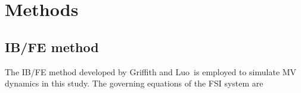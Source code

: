 \documentclass[fleqn,10pt]{wlscirep}
\begin{document}



\section*{Methods}

\subsection*{IB/FE method}

The IB/FE method developed by Griffith and Luo\,\cite{Boyce2017Hybrid} is employed to simulate  MV dynamics in this study. The governing equations of the FSI system are
\end{document}
